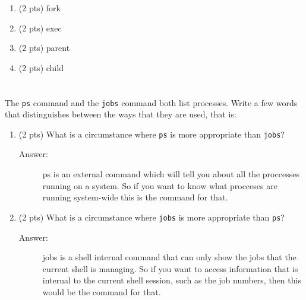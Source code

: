 \documentclass[11pt]{article}
\begin{document}
\begin{enumerate}
\item (2 pts) fork

\vspace{4em}

\item (2 pts) exec

\vspace{4em}

\item (2 pts) parent

\vspace{4em}

\item (2 pts) child

\vspace{4em}
\end{enumerate}

\section{}
\label{sec:orgaa3ec2c}

The \texttt{ps} command and the \texttt{jobs} command both list processes. Write a few
words that distinguishes between the ways that they are used, that is:

\begin{enumerate}
\item (2 pts) What is a circumstance where \texttt{ps} is more appropriate than
\texttt{jobs}?

\begin{description}
    \item[Answer:] ps is an external command which will tell you about all the proccesses running on a system. So if you want to know what procceses are running system-wide this is the command for that.
\end{description}

\item (2 pts) What is a circumstance where \texttt{jobs} is more appropriate than
\texttt{ps}?

\begin{description}
    \item[Answer:] jobs is a shell internal command that can only show the jobs that the current shell is managing. So if you want to access information that is internal to the current shell session, such as the job numbers, then this would be the command for that.
\end{description}
\end{enumerate}
\end{document}
